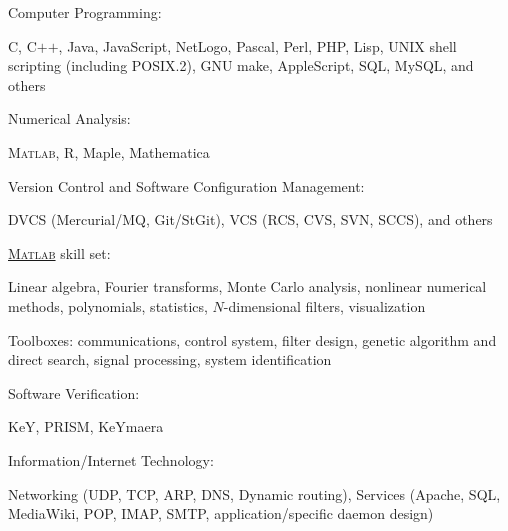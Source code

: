 \documentclass[10pt]{article}           %
\newcommand{\mathalt}[2]{#2}
\newcommand{\halfblankline}{\quad\vspace{-0.5\baselineskip}\pagebreak[3]}
\providecommand\Matlab{\textsc{Matlab}}
\begin{document}
\halfblankline

Computer Programming:
%
\begin{cvlist}
    \item C, C\mathalt{plus}{$+$}\mathalt{plus}{$+$}, Java, JavaScript, NetLogo, Pascal, Perl, PHP,
        Lisp, UNIX shell scripting (including POSIX.2), GNU make,
        AppleScript, SQL, MySQL, and others
\end{cvlist}

\halfblankline

Numerical Analysis:
%
\begin{cvlist}
    \item \Matlab, R, Maple, Mathematica
\end{cvlist}

\halfblankline

Version Control and Software Configuration Management:
%
\begin{cvlist}
    \item DVCS (Mercurial/MQ, Git/StGit), VCS (RCS, CVS, SVN, SCCS), and
        others
\end{cvlist}

\halfblankline

\href{http://www.mathworks.com/products/matlab/}{\Matlab} skill set:
%
\begin{cvlist}
    \item Linear algebra, Fourier transforms, Monte Carlo analysis,
        nonlinear numerical methods, polynomials, statistics,
        \mathalt{N}{$N$}-dimensional filters, visualization

    \item Toolboxes: communications, control system, filter design,
        genetic algorithm and direct search, signal processing, system
        identification
\end{cvlist}

\halfblankline

Software Verification:
%
\begin{cvlist}
    \item KeY, PRISM, KeYmaera
\end{cvlist}

\halfblankline

Information/Internet Technology:
%
\begin{cvlist}
    \item Networking (UDP, TCP, ARP, DNS, Dynamic
        routing), Services (Apache, SQL, MediaWiki, POP, IMAP, SMTP,
        application\-/specific daemon design)
\end{cvlist}
\end{document}
